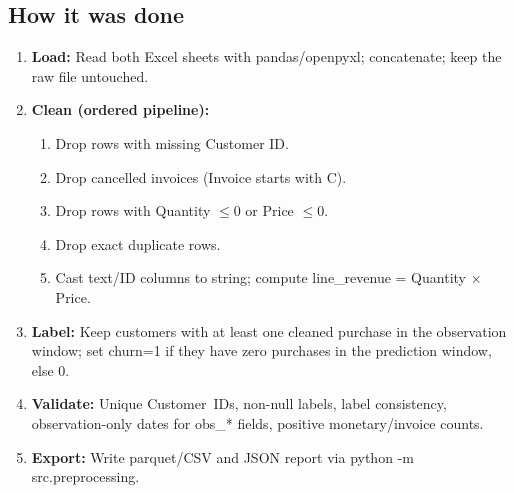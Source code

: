 \documentclass[11pt,a4paper]{article}
\renewcommand{\texttt}[1]{#1}
\begin{document}
\subsection{How it was done}
\begin{enumerate}
  \item \textbf{Load:} Read both Excel sheets with pandas/\texttt{openpyxl};
        concatenate; keep the raw file untouched.
  \item \textbf{Clean (ordered pipeline):}
        \begin{enumerate}
          \item Drop rows with missing \texttt{Customer ID}.
          \item Drop cancelled invoices (\texttt{Invoice} starts with \texttt{C}).
          \item Drop rows with \texttt{Quantity} $\le 0$ or \texttt{Price} $\le 0$.
          \item Drop exact duplicate rows.
          \item Cast text/ID columns to string; compute
                \texttt{line\_revenue = Quantity $\times$ Price}.
        \end{enumerate}
  \item \textbf{Label:} Keep customers with at least one cleaned purchase in the
        observation window; set \texttt{churn=1} if they have zero purchases in
        the prediction window, else $0$.
  \item \textbf{Validate:} Unique Customer~IDs, non-null labels, label
        consistency, observation-only dates for \texttt{obs\_*} fields, positive
        monetary/invoice counts.
  \item \textbf{Export:} Write parquet/CSV and JSON report via
        \texttt{python -m src.preprocessing}.
\end{enumerate}
\end{document}
